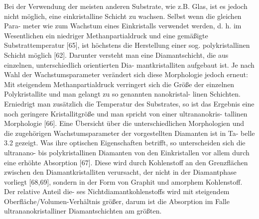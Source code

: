      Bei der Verwendung der meisten anderen Substrate, wie z.B. Glas, ist es jedoch nicht möglich, eine einkristalline Schicht zu wachsen. Selbst wenn die gleichen Para- meter wie zum Wachstum eines Einkristalls verwendet werden, d. h. im Wesentlichen ein niedriger Methanpartialdruck und eine gemäßigte Substrattemperatur [65], ist höchstens die Herstellung einer sog. polykristallinen Schicht möglich [62]. Darunter versteht man eine Diamantschicht, die aus einzelnen, unterschiedlich orientierten Dia- mantkristalliten aufgebaut ist. Je nach Wahl der Wachstumsparameter verändert sich diese Morphologie jedoch erneut: Mit steigendem Methanpartialdruck verringert sich die Größe der einzelnen Polykristallite und man gelangt zu so genannten nanokristal- linen Schichten. Erniedrigt man zusätzlich die Temperatur des Substrates, so ist das Ergebnis eine noch geringere Kristallitgröße und man spricht von einer ultrananokris- tallinen Morphologie [66]. Eine Übersicht über die unterschiedlichen Morphologien und die zugehörigen Wachstumsparameter der vorgestellten Diamanten ist in Ta- belle 3.2 gezeigt. Was ihre optischen Eigenschaften betrifft, so unterscheiden sich die ultranano- bis polykristallinen Diamanten von den Einkristallen vor allem durch eine erhöhte Absorption [67]. Diese wird durch Kohlenstoff an den Grenzflächen zwischen den Diamantkristalliten verursacht, der nicht in der Diamantphase vorliegt [68,69], sondern in der Form von Graphit und amorphem Kohlenstoff. Der relative Anteil die- ses Nichtdiamantkohlenstoffs wird mit steigendem Oberfläche/Volumen-Verhältnis größer, darum ist die Absorption im Falle ultrananokristalliner Diamantschichten am größten.

\section{\sivs}

